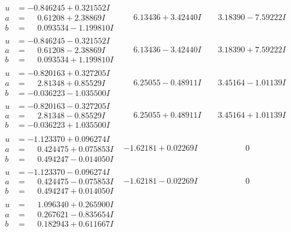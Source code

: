 \documentclass[1p]{elsarticle_modified}
\theoremstyle{definition}
\begin{document}
$$\begin{array}{c|c|c}
\begin{aligned}
u &= -0.846245 + 0.321552 I \\
a &= \phantom{-}0.61208 + 2.38869 I \\
b &= \phantom{-}0.093534 - 1.199810 I\end{aligned}
 & \phantom{-}6.13436 + 3.42440 I & \phantom{-}3.18390 - 7.59222 I \\ \hline\begin{aligned}
u &= -0.846245 - 0.321552 I \\
a &= \phantom{-}0.61208 - 2.38869 I \\
b &= \phantom{-}0.093534 + 1.199810 I\end{aligned}
 & \phantom{-}6.13436 - 3.42440 I & \phantom{-}3.18390 + 7.59222 I \\ \hline\begin{aligned}
u &= -0.820163 + 0.327205 I \\
a &= \phantom{-}2.81348 + 0.85529 I \\
b &= -0.036223 - 1.035500 I\end{aligned}
 & \phantom{-}6.25055 - 0.48911 I & \phantom{-}3.45164 - 1.01139 I \\ \hline\begin{aligned}
u &= -0.820163 - 0.327205 I \\
a &= \phantom{-}2.81348 - 0.85529 I \\
b &= -0.036223 + 1.035500 I\end{aligned}
 & \phantom{-}6.25055 + 0.48911 I & \phantom{-}3.45164 + 1.01139 I \\ \hline\begin{aligned}
u &= -1.123370 + 0.096274 I \\
a &= \phantom{-}0.424475 + 0.075853 I \\
b &= \phantom{-}0.494247 - 0.014050 I\end{aligned}
 & -1.62181 + 0.02269 I & \phantom{-0.000000 } 0 \\ \hline\begin{aligned}
u &= -1.123370 - 0.096274 I \\
a &= \phantom{-}0.424475 - 0.075853 I \\
b &= \phantom{-}0.494247 + 0.014050 I\end{aligned}
 & -1.62181 - 0.02269 I & \phantom{-0.000000 } 0 \\ \hline\begin{aligned}
u &= \phantom{-}1.096340 + 0.265900 I \\
a &= \phantom{-}0.267621 - 0.835654 I \\
b &= \phantom{-}0.182943 + 0.611667 I\end{aligned}

\end{array}$$
\end{document}
